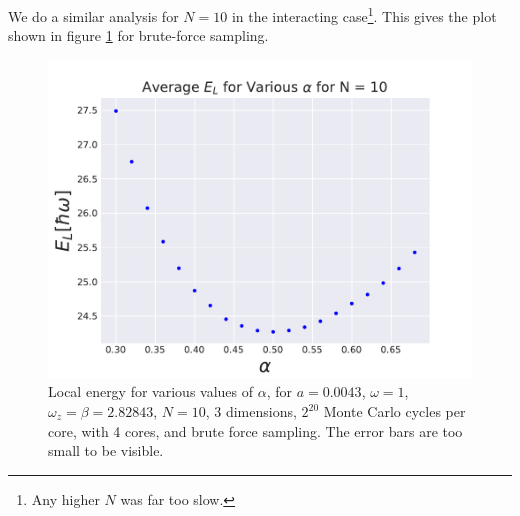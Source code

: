 \documentclass[a4paper, 10pt]{article}
\begin{document}
	\linebreak
	We do a similar analysis for $N=10$ in the interacting case\footnote{Any higher $N$ was far too slow.}. This gives the plot shown in figure \ref{fig:EL_alpha_N10_interacting} for brute-force sampling.
			\begin{figure}[ht!]
				\centering
				\includegraphics[scale=0.8]{../Results/Energy_as_a_function_of_alpha/Alpha_v_EL_Interacting_N10.pdf}
				\caption{Local energy for various values of $\alpha$, for $a=0.0043$, $\omega=1$, $\omega_z=\beta=2.82843$, $N=10$, 3 dimensions, $2^{20}$ Monte Carlo cycles per core, with 4 cores, and brute force sampling. The error bars are too small to be visible.}\label{fig:EL_alpha_N10_interacting}
			\end{figure}
\end{document}

